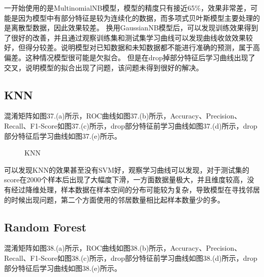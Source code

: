 \documentclass[../main.tex]{subfiles}
\begin{document}
        一开始使用的是MultinomialNB模型，模型的精度只有接近65\%，效果非常差，可能是因为模型中有部分特征是较为连续化的数据，而多项式贝叶斯模型主要处理的是离散型数据，因此效果较差。
        换用GaussianNB模型后，可以发现训练效果得到了很好的改善，并且通过观察训练集和测试集学习曲线可以发现曲线收敛效果较好，但得分较差。说明模型对已知数据和未知数据都不能进行准确的预测，属于高偏差。这种情况模型很可能是欠拟合。
        但是在drop掉部分特征后学习曲线出现了交叉，说明模型的拟合出现了问题，该问题未得到很好的解决。

    \subsection{KNN}

        混淆矩阵如图37.(a)所示，ROC曲线如图37.(b)所示，Accuracy、Precision、Recall、F1-Score如图37.(c)所示，drop部分特征前学习曲线如图37.(d)所示，drop部分特征后学习曲线如图37.(e)所示。

        \begin{figure}[H]
            \centering


            \caption{KNN}
        \end{figure}

        可以发现KNN的效果甚至没有SVM好，观察学习曲线可以发现，对于测试集的score在2000个样本后出现了大幅度下滑，一方面数据量极大，并且维度较高，没有经过降维处理，样本数据在样本空间的分布可能较为复杂，导致模型在寻找邻居的时候出现问题，第二个方面使用的邻居数量相比起样本数量少的多。

    \subsection{Random Forest}

        混淆矩阵如图38.(a)所示，ROC曲线如图38.(b)所示，Accuracy、Precision、Recall、F1-Score如图38.(c)所示，drop部分特征前学习曲线如图38.(d)所示，drop部分特征后学习曲线如图38.(e)所示。
\end{document}
